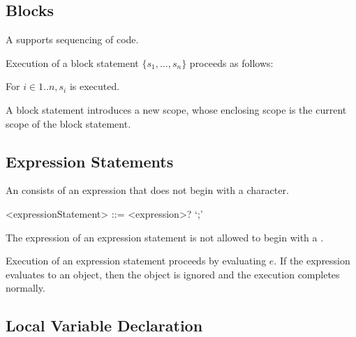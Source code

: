\documentclass[makeidx]{article}
\begin{document}
{%


\subsection{Blocks}

\LMHash{}%
A  supports sequencing of code.

\LMHash{}%
Execution of a block statement $\{s_1, \ldots, s_n\}$ proceeds as follows:

\LMHash{}%
For $i \in 1 .. n, s_i$ is executed.

\LMHash{}%
A block statement introduces a new scope,
whose enclosing scope is the current scope of the block statement.


\subsection{Expression Statements}

\LMHash{}%
An  consists of an expression that does not
begin with a \lit{\{} character.

\begin{grammar}
<expressionStatement> ::= <expression>? `;'
\end{grammar}

\LMHash{}%
The expression of an expression statement is not allowed
to begin with a \lit{\{}.

\LMHash{}%
Execution of an expression statement  proceeds by evaluating $e$.
If the expression evaluates to an object,
then the object is ignored and the execution completes normally.


\subsection{Local Variable Declaration}

}
\end{document}
